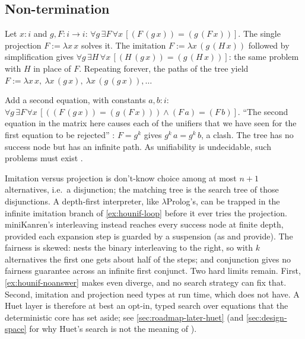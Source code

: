 \subsection{Non-termination}

\begin{example}[{\spaceskip=.58\fontdimen2\font\relax An infinite branch with infinitely many answers {\book{218}}}]\label{ex:hounif-loop}
Let $x:i$ and $g,F:i\to i$: $\forall g\,\exists F\,\forall x\,[(F\,(g\,x))=(g\,(F\,x))]$. The single projection
$F:=\lambda x\,x$ solves it. The imitation $F:=\lambda x\,(g\,(H\,x))$ followed by simplification gives
$\forall g\,\exists H\,\forall x\,[(H\,(g\,x))=(g\,(H\,x))]$: the same problem with $H$ in place of $F$. Repeating
forever, the paths of the tree yield $F:=\lambda x\,x,\ \lambda x\,(g\,x),\ \lambda x\,(g\,(g\,x)),\dots$
\end{example}

\begin{example}\label{ex:hounif-noanswer}
Add a second equation, with constants $a,b:i$: $\forall g\,\exists F\,\forall x\,[((F\,(g\,x))=(g\,(F\,x)))\wedge(F\,a)=(F\,b)]$.
\enquote{The second equation in the matrix here causes each of the unifiers that we have seen for the first
equation to be rejected} : $F=g^k$ gives $g^k\,a=g^k\,b$, a clash. The tree has no success node but has an
infinite path. As unifiability is undecidable, such problems must exist .
\end{example}

\begin{kanren}
Imitation versus projection is don't-know choice among at most $n+1$ alternatives, i.e.\ a disjunction; the
matching tree is the search tree of those disjunctions. A depth-first interpreter, like $\lambda$Prolog's, can be
trapped in the infinite imitation branch of \cref{ex:hounif-loop} before it ever tries the projection.
miniKanren's interleaving  instead reaches every success node at finite depth, provided each expansion
step is guarded by a suspension (as  and  provide). The fairness is
skewed:  nests the binary interleaving to the right, so with $k$ alternatives the first one gets
about half of the steps; and conjunction gives no fairness guarantee across an infinite first conjunct.
Two hard limits remain. First, \cref{ex:hounif-noanswer} makes even  diverge, and no search
strategy can fix that. Second, imitation and projection need types at run time, which \micro{} does not have.
A Huet layer is therefore at best an opt-in, typed search over equations that the deterministic core has set
aside; see \cref{sec:roadmap-later-huet} (and \cref{sec:design-space} for why Huet's search is not the meaning of ).
\end{kanren}

